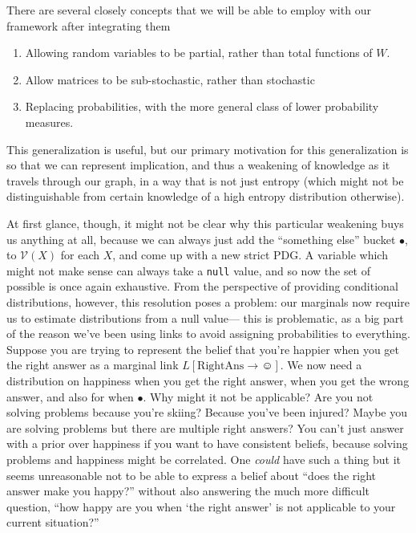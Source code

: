 \documentclass{article}
\newcommand{\MN}{PDG}%
\begin{document}
	There are several closely concepts that we will be able to employ with our framework after integrating them
	\begin{enumerate}[nosep]
		\item Allowing random variables to be partial, rather than total functions of $W$. 
		\item Allow matrices to be sub-stochastic, rather than stochastic
		\item Replacing probabilities, with the more general class of lower probability measures.
	\end{enumerate}

	This generalization is useful, but our primary motivation for this generalization is so that we can represent implication, and thus a weakening of knowledge as it travels through our graph, in a way that is not just entropy (which might not be distinguishable from certain knowledge of a high entropy distribution otherwise). 

	At first glance, though, it might not be clear why this particular weakening buys us anything at all, because we can always just add the ``something else'' bucket $\bullet$, to $\mathcal V(X)$ for each $X$, and come up with a new strict \MN. A variable which might not make sense can always take a \texttt{null} value, and so now the set of possible is once again exhaustive. From the perspective of providing conditional distributions, however, this resolution poses a problem: our marginals now require us to estimate distributions from a null value--- this is problematic, as a big part of the reason we've been using links to avoid assigning probabilities to everything. Suppose you are trying to represent the belief that you're happier when you get the right answer as a marginal link $L[\mathrm{RightAns}\to \smiley]$. We now need a distribution on happiness when you get the right answer, when you get the wrong answer, and also for when $\bullet$. Why might it not be applicable? Are you not solving problems because you're skiing? Because you've been injured? Maybe you are solving problems but there are multiple right answers? You can't just answer with a prior over happiness if you want to have consistent beliefs, because solving problems and happiness might be correlated. One \emph{could} have such a thing but it seems unreasonable not to be able to express a belief about ``does the right answer make you happy?'' without also answering the much more difficult question, ``how happy are you when `the right answer' is not applicable to your current situation?''
\end{document}
